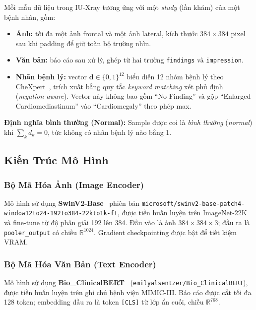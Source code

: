 \documentclass[12pt, a4paper]{article}
\newcommand{\vect}[1]{\mathbf{#1}}
\begin{document}
Mỗi mẫu dữ liệu trong IU-Xray tương ứng với một \textit{study} (lần khám) của
một bệnh nhân, gồm:
\begin{itemize}
  \item \textbf{Ảnh:} tối đa một ảnh frontal và một ảnh lateral, kích thước
    $384 \times 384$ pixel sau khi padding để giữ toàn bộ trường nhìn.
  \item \textbf{Văn bản:} báo cáo sau xử lý, ghép từ hai trường \texttt{findings}
    và \texttt{impression}.
  \item \textbf{Nhãn bệnh lý:} vector $\vect{d} \in \{0,1\}^{12}$ biểu diễn
    12 nhóm bệnh lý theo CheXpert~\citep{irvin2019chexpert}, trích xuất bằng
    quy tắc \textit{keyword matching} xét phủ định (\textit{negation-aware}).
    Vector này không bao gồm ``No Finding'' và gộp
    ``Enlarged Cardiomediastinum'' vào ``Cardiomegaly'' theo phép max.
\end{itemize}

\textbf{Định nghĩa bình thường (Normal):}
Sample được coi là \textit{bình thường} (\textit{normal}) khi
$\sum_k d_k = 0$, tức không có nhãn bệnh lý nào bằng 1.

\subsection{Kiến Trúc Mô Hình}
\label{sec:model}

\subsubsection{Bộ Mã Hóa Ảnh (Image Encoder)}

Mô hình sử dụng \textbf{SwinV2-Base}~\citep{liu2022swin} phiên bản
\texttt{microsoft/swinv2-base-patch4-window12to24-192to384-22kto1k-ft}, được
tiền huấn luyện trên ImageNet-22K và fine-tune từ độ phân giải 192 lên 384.
Đầu vào là ảnh $384 \times 384 \times 3$; đầu ra là \texttt{pooler\_output}
có chiều $\mathbb{R}^{1024}$. Gradient checkpointing được bật để tiết kiệm
VRAM.

\subsubsection{Bộ Mã Hóa Văn Bản (Text Encoder)}

Mô hình sử dụng \textbf{Bio\_ClinicalBERT}~\citep{alsentzer2019publicly}
(\texttt{emilyalsentzer/Bio\_ClinicalBERT}), được tiền huấn luyện trên ghi chú
bệnh viện MIMIC-III. Báo cáo được cắt tối đa 128 token; embedding đầu ra là
token \texttt{[CLS]} từ lớp ẩn cuối, chiều $\mathbb{R}^{768}$.
\end{document}
